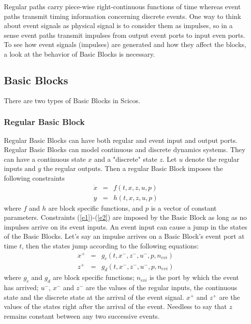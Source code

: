 Regular paths carry piece-wise right-continuous functions of time
whereas event paths transmit timing information concerning discrete
events. One way to think about event signals as physical signal is to
consider them as impulses, so in a sense event paths transmit
impulses from output event ports to input even ports. To see how event
signals (impulses) are generated and how they affect the blocks, a
look at the behavior of Basic Blocks is necessary.

\subsection{Basic Blocks}
There are two types of Basic Blocks in Scicos.
\subsubsection{Regular Basic Block}
Regular Basic Blocks can have both regular and event input and output
ports. Regular Basic Blocks can model continuous and discrete dynamics
systems. They can have a continuous state $x$ and a "discrete" state
$z$. Let $u$ denote the regular inputs and $y$ the regular
outputs. Then a regular Basic Block imposes the following constraints
\begin{eqnarray}
\dot{x} &=& f(t,x,z,u,p) \label{e1}\\
y&=&h(t,x,z,u,p) \label{e2}
\end{eqnarray}
where $f$ and $h$ are block specific functions, and $p$ is a vector of
constant parameters. Constraints (\ref{e1})-(\ref{e2}) are imposed by
the Basic Block as long as no impulses arrive on its event inputs. An
event input can cause a jump in the states of the Basic Blocks. Let's
say an impulse arrives on a Basic Block's event port at time $t$, then
the states jump according to the following equations:
\begin{eqnarray}
{x}^+ &=& g_c(t,x^-,z^-,u^-,p,n_{evi}) \label{e11}\\
{z}^+ &=& g_d(t,x^-,z^-,u^-,p,n_{evi}) \label{e12}
\end{eqnarray}
where $g_c$ and $g_d$ are block specific functions; $n_{evi}$ is the
port by which the event has arrived; $u^-$, ${x}^-$ and ${z}^-$ are
the values of the regular inputs, the continuous state and the
discrete state at the arrival of the event signal. ${x}^+$ and ${z}^+$
are the values of the states right after the arrival of the event.
Needless to say that $z$ remains constant between any two successive
events. 

